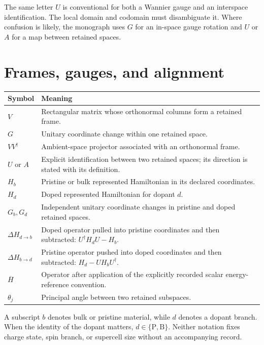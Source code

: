 The same letter $U$ is conventional for both a Wannier gauge and an interspace
identification. The local domain and codomain must disambiguate it. Where
confusion is likely, the monograph uses $G$ for an in-space gauge rotation and
$U$ or $A$ for a map between retained spaces.

\section{Frames, gauges, and alignment}


\begin{center}
\small
\begin{tabular}{@{}p{}p{}@{}}
\toprule
Symbol & Meaning \\
\midrule
$V$ & Rectangular matrix whose orthonormal columns form a retained frame. \\
$G$ & Unitary coordinate change within one retained space. \\
$VV^{\dagger}$ & Ambient-space projector associated with an orthonormal frame. \\
$U$ or $A$ & Explicit identification between two retained spaces; its direction
is stated with its definition. \\
$H_b$ & Pristine or bulk represented Hamiltonian in its declared coordinates. \\
$H_d$ & Doped represented Hamiltonian for dopant $d$. \\
$G_b,G_d$ & Independent unitary coordinate changes in pristine and doped
retained spaces. \\
$\Delta H_{d\to b}$ & Doped operator pulled into pristine coordinates and then
subtracted: $U^{\dagger}H_dU-H_b$. \\
$\Delta H_{b\to d}$ & Pristine operator pushed into doped coordinates and then
subtracted: $H_d-UH_bU^{\dagger}$. \\
$\overline H$ & Operator after application of the explicitly recorded scalar
energy-reference convention. \\
$\theta_j$ & Principal angle between two retained subspaces. \\
\bottomrule
\end{tabular}
\end{center}

A subscript $b$ denotes bulk or pristine material, while $d$ denotes a dopant
branch. When the identity of the dopant matters,
$d\in\{\mathrm P,\mathrm B\}$. Neither notation fixes charge state, spin branch,
or supercell size without an accompanying record.

